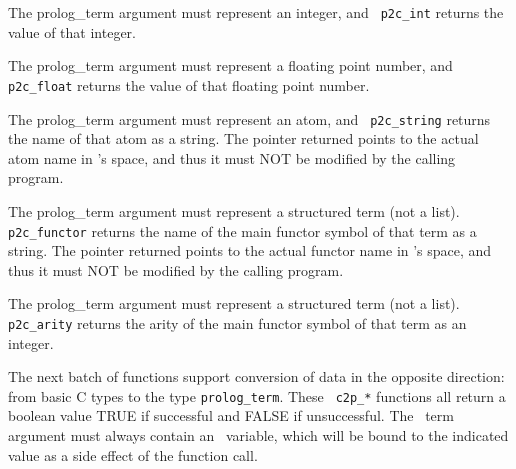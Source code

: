 \begin{description}
 
    The prolog\_term argument must represent an integer, and {\tt
    p2c\_int} returns the value of that integer.

 
    The prolog\_term argument must represent a floating point number,
    and {\tt p2c\_float} returns the value of that floating point
    number.

 
    The prolog\_term argument must represent an atom, and {\tt
    p2c\_string} returns the name of that atom as a string. The
    pointer returned points to the actual atom name in \ourprolog 's
    space, and thus it must NOT be modified by the calling program.

 
    The prolog\_term argument must represent a structured term (not a
    list).  {\tt p2c\_functor} returns the name of the main functor
    symbol of that term as a string. The pointer returned points to
    the actual functor name in \ourprolog 's space, and thus it must
    NOT be modified by the calling program.

 
    The prolog\_term argument must represent a structured term (not a
    list).  {\tt p2c\_arity} returns the arity of the main functor
    symbol of that term as an integer.

\end{description}

The next batch of functions support conversion of data in the opposite
direction: from basic C types to the type {\tt prolog\_term}.  These {\tt
  c2p\_*} functions all return a boolean value TRUE if successful and FALSE
if unsuccessful.  The \ourprolog\ term argument must always contain an
\ourprolog\ variable, which will be bound to the indicated value as a side
effect of the function call.

